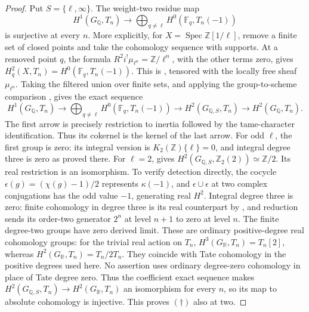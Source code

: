 \begin{proof}
Put \(S=\{\ell,\infty\}\). The weight-two residue map
\[
 H^1(G_{\mathbb Q},T_n)\longrightarrow
       \bigoplus_{q\ne\ell}H^0(\mathbb F_q,T_n(-1))
       \tag{\dagger}
\]
is surjective at every \(n\). More explicitly, for
\(X=\operatorname{Spec}\mathbb Z[1/\ell]\), remove a finite
set of closed points and take the cohomology sequence with
supports. At a removed point \(q\), the formula
\(R^2i^!\mu_{\ell^n}=\mathbb Z/\ell^n\), with the other
terms zero, gives
\(H^2_q(X,T_n)=H^0(\mathbb F_q,T_n(-1))\).
This is \cite[II.1.7(b)]{GhostMilneADT}, tensored with the
locally free sheaf \(\mu_{\ell^n}\). Taking the filtered
union over finite sets, and applying the group-to-scheme
comparison \cite[II.2.9]{GhostMilneADT}, gives the exact
sequence
\[
 H^1(G_{\mathbb Q},T_n)\longrightarrow
 \bigoplus_{q\ne\ell}H^0(\mathbb F_q,T_n(-1))
 \longrightarrow H^2(G_{\mathbb Q,S},T_n)
 \longrightarrow H^2(G_{\mathbb Q},T_n).
\]
The first arrow is precisely restriction to inertia followed
by the tame-character identification. Thus its cokernel is
the kernel of the last arrow.
For odd \(\ell\), the first group is zero: its integral
version is \(K_2(\mathbb Z)\{\ell\}=0\), and integral
degree three is zero as proved there. For \(\ell=2\),
\cite[VI.9.11, case \(n=2\)]{GhostWeibelKbook} gives
\(H^2(G_{\mathbb Q,S},\mathbb Z_2(2))\simeq\mathbb Z/2\).
Its real restriction is an isomorphism. To verify detection
directly, the cocycle
\(\epsilon(g)=(\chi(g)-1)/2\) represents \(\kappa(-1)\),
and \(\epsilon\cup\epsilon\) at two complex conjugations
has the odd value \(-1\), generating real \(H^2\).
Integral degree three is zero: finite cohomology in degree
three is its real counterpart by
\cite[I.4.10(c)]{GhostMilneADT}, and reduction sends its
order-two generator \(2^n\) at level \(n+1\) to zero
at level \(n\). The finite degree-two groups have zero
derived limit. These are ordinary positive-degree real
cohomology groups: for the trivial real action on \(T_n\),
\(H^3(G_{\mathbb R},T_n)=T_n[2]\), whereas
\(H^2(G_{\mathbb R},T_n)=T_n/2T_n\).
They coincide with Tate cohomology in the positive degrees
used here. No assertion uses ordinary degree-zero cohomology
in place of Tate degree zero. Thus the coefficient exact sequence makes
\(H^2(G_{\mathbb Q,S},T_n)\to H^2(G_{\mathbb R},T_n)\)
an isomorphism for every \(n\), so its map to absolute
cohomology is injective. This proves \((\dagger)\) also
at two.


\end{proof}
